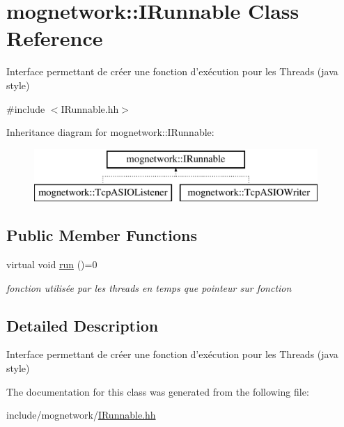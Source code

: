 \hypertarget{classmognetwork_1_1_i_runnable}{\section{mognetwork\-:\-:I\-Runnable Class Reference}
\label{classmognetwork_1_1_i_runnable}
}


Interface permettant de créer une fonction d'exécution pour les Threads (java style)  




{\ttfamily \#include $<$I\-Runnable.\-hh$>$}

Inheritance diagram for mognetwork\-:\-:I\-Runnable\-:\begin{figure}[H]
\begin{center}
\leavevmode
\includegraphics[height=2.000000cm]{classmognetwork_1_1_i_runnable}
\end{center}
\end{figure}
\subsection*{Public Member Functions}
\begin{DoxyCompactItemize}
\item 
\hypertarget{classmognetwork_1_1_i_runnable_ac53515c8ecf2b2c79cb9c161fdd600d1}{virtual void \hyperlink{classmognetwork_1_1_i_runnable_ac53515c8ecf2b2c79cb9c161fdd600d1}{run} ()=0}\label{classmognetwork_1_1_i_runnable_ac53515c8ecf2b2c79cb9c161fdd600d1}

\begin{DoxyCompactList}\small\item\em fonction utilisée par les threads en temps que pointeur sur fonction \end{DoxyCompactList}\end{DoxyCompactItemize}


\subsection{Detailed Description}
Interface permettant de créer une fonction d'exécution pour les Threads (java style) 

The documentation for this class was generated from the following file\-:\begin{DoxyCompactItemize}
\item 
include/mognetwork/\hyperlink{_i_runnable_8hh}{I\-Runnable.\-hh}\end{DoxyCompactItemize}
